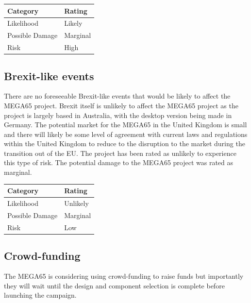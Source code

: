\begin{tabular}{l|l} %
    	\textbf{Category} 	&	\textbf{Rating} \\
      \hline
     Likelihood			&	Likely \\
     Possible Damage 	& 	Marginal \\
     Risk 				&	High		\\	
    \end{tabular}


\subsection{Brexit-like events}
There are no foreseeable Brexit-like events that would be likely to affect the MEGA65 project. Brexit itself is unlikely to affect the MEGA65 project as the project is largely based in Australia, with the desktop version being made in Germany. The potential market for the MEGA65 in the United Kingdom is small and there will likely be some level of agreement with current laws and regulations within the United Kingdom to reduce to the disruption to the market during the transition out of the EU. The project has been rated as unlikely to experience this type of risk. The potential damage to the MEGA65 project was rated as marginal. \\

\begin{tabular}{l|l} %
    	\textbf{Category} 	&	\textbf{Rating} \\
      \hline
     Likelihood			&	Unlikely \\
     Possible Damage 	& 	Marginal \\
     Risk 				&	Low		\\	
    \end{tabular}


\subsection{Crowd-funding}
The MEGA65 is considering using crowd-funding to raise funds but importantly they will wait until the design and component selection is complete before launching the campaign.

